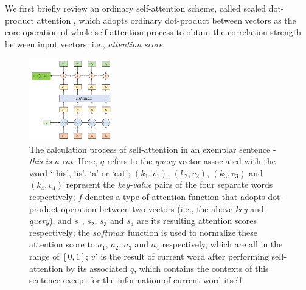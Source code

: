 We first briefly review an ordinary self-attention scheme, called scaled dot-product attention \cite{vaswani2017attention}, which adopts ordinary dot-product between vectors as the core operation of whole self-attention process to obtain the correlation strength between input vectors, i.e., \textit{attention score}. 

\begin{figure}[!ht]
    \centering
    \includegraphics[width=0.32\textwidth]{pictures/Attention.png}
    \caption{The calculation process of self-attention in an exemplar sentence - \textit{this is a cat}. Here, $q$ refers to the \textit{query} vector associated with the word ‘this’, ‘is’, ‘a’ or ‘cat’; $(k_1, v_1)$, $(k_2, v_2)$, $(k_3, v_3)$ and $(k_4, v_4)$ represent the \textit{key-value} pairs of the four separate words respectively; $f$ denotes a type of attention function that adopts dot-product operation between two vectors (i.e., the above \textit{key} and \textit{query}), and $s_1$, $s_2$, $s_3$ and $s_4$ are its resulting attention scores respectively; the $softmax$ function is used to normalize these attention score to $a_1$, $a_2$, $a_3$ and $a_4$ respectively, which are all in the range of $[0, 1]$; $v'$ is the result of current word after performing self-attention by its associated $q$, which contains the contexts of this sentence except for the information of current word itself.}
    \label{fig:attention}
\end{figure}

